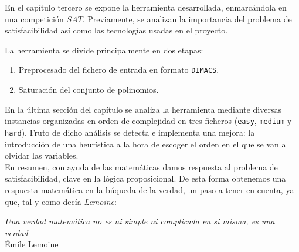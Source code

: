 En el capítulo tercero se expone la herramienta desarrollada, enmarcándola en una competición $SAT$. Previamente, se analizan la importancia del problema de satisfacibilidad así como las tecnologías usadas en el proyecto.

\newpage

 La herramienta se divide principalmente en dos etapas: 

\begin{enumerate}
\item Preprocesado del fichero de entrada en formato \texttt{DIMACS}.
\item Saturación del conjunto de polinomios.
\end{enumerate}

En la última sección del capítulo se analiza la herramienta mediante diversas instancias organizadas en orden de complejidad en tres ficheros (\texttt{easy}, \texttt{medium} y \texttt{hard}). Fruto de dicho análisis se detecta e implementa una mejora: la introducción de una heurística a la hora de escoger el orden en el que se van a olvidar las variables.\\

En resumen, con ayuda de las matemáticas damos respuesta al problema de satisfacibilidad, clave en la lógica proposicional. De esta forma obtenemos una respuesta matemática en la búqueda de la verdad, un paso a tener en cuenta, ya que, tal y como decía \textit{Lemoine}:

\begin{center}
\textit{Una verdad matemática no es ni simple ni complicada en si misma, es una verdad}\\
\hspace{10.7cm} Émile Lemoine
\end{center}